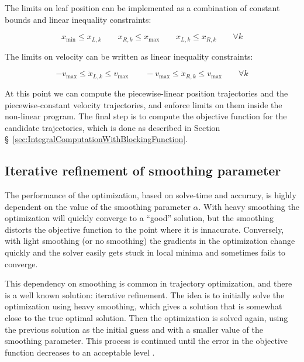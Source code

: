 \documentclass{iopart}
\newcommand{\quotes}[1]{``#1''}   %
\begin{document}
The limits on leaf position can be implemented as a combination of
constant bounds and linear inequality constraints:

\begin{equation}
  x_\text{min} \leq x_{L, k}
  \quad \quad
  x_{R, k} \leq x_\text{max}
  \quad \quad
  x_{L, k} \leq x_{R, k}
  \quad \quad
  \forall k
  \label{eqn:PositionLimits}
\end{equation}

The limits on velocity can be written as linear inequality constraints:

\begin{equation}
  -v_\text{max} \leq \dot{x}_{L, k} \leq v_\text{max}
  \quad \quad
  -v_\text{max} \leq \dot{x}_{R, k} \leq v_\text{max}
  \quad \quad \forall k
  \label{eqn:VelocityLimits}
\end{equation}

At this point we can compute the piecewise-linear position trajectories and the
piecewise-constant velocity trajectories, and enforce limits on them inside the non-linear program.
The final step is to compute the objective function for the candidate trajectories,
which is done as described in Section \S~\ref{sec:IntegralComputationWithBlockingFunction}.

\subsection{Iterative refinement of smoothing parameter}

The performance of the optimization, based on solve-time and accuracy, is highly dependent on the value of the smoothing parameter $\alpha$. With heavy smoothing the optimization will quickly converge to a \quotes{good} solution, but the smoothing distorts the objective function to the point where it is innacurate. Conversely, with light smoothing (or no smoothing) the gradients in the optimization change quickly and the solver easily gets stuck in local minima and sometimes fails to converge.

This dependency on smoothing is common in trajectory optimization, and there is a well known solution: iterative refinement. The idea is to initially solve the optimization using heavy smoothing, which gives a solution that is somewhat close to the true optimal solution. Then the optimization is solved again, using the previous solution as the initial guess and with a smaller value of the smoothing parameter. This process is continued until the error in the objective function decreases to an acceptable level \cite{Srinivasan2006}.
\end{document}
